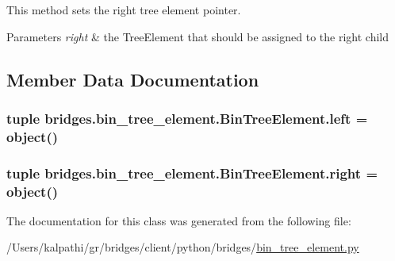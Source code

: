 This method sets the right tree element pointer. 


\begin{DoxyParams}{Parameters}
{\em right} & the Tree\+Element that should be assigned to the right child \\
\hline
\end{DoxyParams}


\subsection{Member Data Documentation}
\hypertarget{classbridges_1_1bin__tree__element_1_1_bin_tree_element_aa3363fa417561642fe5c025465a284bc}{}
\subsubsection[{left}]{\setlength{\rightskip}{0pt plus 5cm}tuple bridges.\+bin\+\_\+tree\+\_\+element.\+Bin\+Tree\+Element.\+left = object()\hspace{0.3cm}{\ttfamily [static]}}\label{classbridges_1_1bin__tree__element_1_1_bin_tree_element_aa3363fa417561642fe5c025465a284bc}
\hypertarget{classbridges_1_1bin__tree__element_1_1_bin_tree_element_a1178847a9c2ea50957f0724e2552fa36}{}
\subsubsection[{right}]{\setlength{\rightskip}{0pt plus 5cm}tuple bridges.\+bin\+\_\+tree\+\_\+element.\+Bin\+Tree\+Element.\+right = object()\hspace{0.3cm}{\ttfamily [static]}}\label{classbridges_1_1bin__tree__element_1_1_bin_tree_element_a1178847a9c2ea50957f0724e2552fa36}


The documentation for this class was generated from the following file\+:\begin{DoxyCompactItemize}
\item 
/\+Users/kalpathi/gr/bridges/client/python/bridges/\hyperlink{bin__tree__element_8py}{bin\+\_\+tree\+\_\+element.\+py}\end{DoxyCompactItemize}

